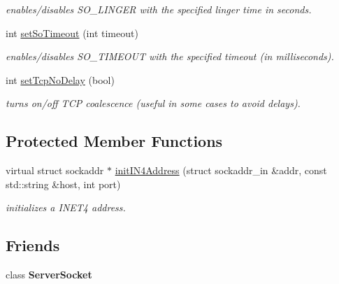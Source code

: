 \begin{DoxyCompactItemize}
\begin{DoxyCompactList}\small\item\em enables/disables S\-O\-\_\-\-L\-I\-N\-G\-E\-R with the specified linger time in seconds. \end{DoxyCompactList}\item 
\hypertarget{classSocket_ad65a22ec40902e2c0a98c5d4ac885f99}{int \hyperlink{classSocket_ad65a22ec40902e2c0a98c5d4ac885f99}{set\-So\-Timeout} (int timeout)}\label{classSocket_ad65a22ec40902e2c0a98c5d4ac885f99}

\begin{DoxyCompactList}\small\item\em enables/disables S\-O\-\_\-\-T\-I\-M\-E\-O\-U\-T with the specified timeout (in milliseconds). \end{DoxyCompactList}\item 
\hypertarget{classSocket_a7bc0110f3bedbb18f26b05ece01553fa}{int \hyperlink{classSocket_a7bc0110f3bedbb18f26b05ece01553fa}{set\-Tcp\-No\-Delay} (bool)}\label{classSocket_a7bc0110f3bedbb18f26b05ece01553fa}

\begin{DoxyCompactList}\small\item\em turns on/off T\-C\-P coalescence (useful in some cases to avoid delays). \end{DoxyCompactList}\end{DoxyCompactItemize}
\subsection*{Protected Member Functions}
\begin{DoxyCompactItemize}
\item 
\hypertarget{classSocket_a7516404e87b557ceef92a72448167252}{virtual struct sockaddr $\ast$ \hyperlink{classSocket_a7516404e87b557ceef92a72448167252}{init\-I\-N4\-Address} (struct sockaddr\-\_\-in \&addr, const std\-::string \&host, int port)}\label{classSocket_a7516404e87b557ceef92a72448167252}

\begin{DoxyCompactList}\small\item\em initializes a I\-N\-E\-T4 address. \end{DoxyCompactList}\end{DoxyCompactItemize}
\subsection*{Friends}
\begin{DoxyCompactItemize}
\item 
\hypertarget{classSocket_a11a8bb11feaafab939278a8285afa567}{class {\bfseries Server\-Socket}}\label{classSocket_a11a8bb11feaafab939278a8285afa567}

\end{DoxyCompactItemize}


